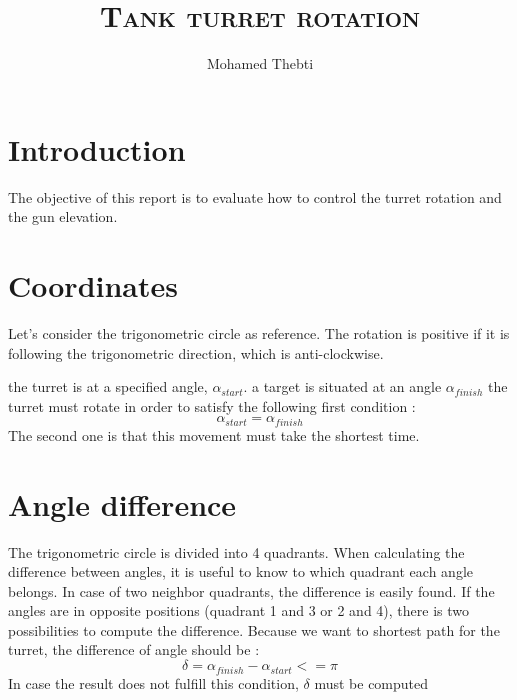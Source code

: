 \documentclass[12pt,a4paper]{article}
\title{
	\Huge\textsc{Tank turret rotation}
}
\author{Mohamed Thebti}
\begin{document}
	\setlength{\parindent}{0mm}
	
	\fancyhead[R]{\slshape \leftmark}
	
	\fancyfoot[C]{}
	\fancyfoot[R]{\thepage}
	
	\maketitle
	\newpage
	
	\tableofcontents
	
	\newpage
	
	
	
	\section{Introduction}
	
	The objective of this report is to evaluate how to control the turret rotation and the gun elevation. 
	
	
	\section{Coordinates}
	Let's consider the trigonometric circle as reference.
	The rotation is positive if it is following the trigonometric direction, which is anti-clockwise.
	
	the turret is at a specified angle, $\alpha_{start}$.
	a target is situated at an angle $\alpha_{finish}$
	the turret must rotate in order to satisfy the following first condition : 
	\begin{equation}
		\alpha_{start} = \alpha_{finish}
	\end{equation}
	The second one is that this movement must take the shortest time. 

	\section{Angle difference}
	The trigonometric circle is divided into 4 quadrants. When calculating the difference between angles, it is useful to know to which quadrant each angle belongs. 
	In case of two neighbor quadrants, the difference is easily found.
	If the angles are in opposite positions (quadrant 1 and 3 or 2 and 4), there is two possibilities to compute the difference. Because we want to shortest path for the turret, the difference of angle should be : 
	\begin{equation}
		\delta = \alpha_{finish} - \alpha_{start} <= \pi
	\end{equation}
	In case the result does not fulfill this condition, $\delta$ must be computed  
	
\end{document}
